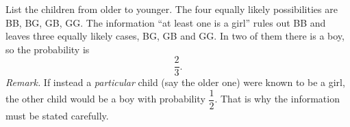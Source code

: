 List the children from older to younger. The four equally likely possibilities are BB, BG, GB, GG. The information ``at least one is a girl'' rules out BB and leaves three equally likely cases, BG, GB and GG. In two of them there is a boy, so the probability is
\[\boxed{\dfrac{2}{3}}.\]
\emph{Remark.} If instead a \emph{particular} child (say the older one) were known to be a girl, the other child would be a boy with probability $\dfrac{1}{2}$. That is why the information must be stated carefully.
